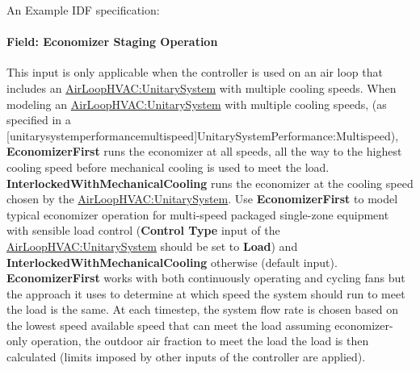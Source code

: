 An Example IDF specification:

\paragraph{Field: Economizer Staging Operation}\label{field-economizer-staging-operation}

This input is only applicable when the controller is used on an air loop that includes an \hyperref[airloophvacunitarysystem]{AirLoopHVAC:UnitarySystem} with multiple cooling speeds. When modeling an \hyperref[airloophvacunitarysystem]{AirLoopHVAC:UnitarySystem} with multiple cooling speeds, (as specified in a [unitarysystemperformancemultispeed]{UnitarySystemPerformance:Multispeed}), \textbf{EconomizerFirst} runs the economizer at all speeds, all the way to the highest cooling speed before mechanical cooling is used to meet the load. \textbf{InterlockedWithMechanicalCooling} runs the economizer at the cooling speed chosen by the \hyperref[airloophvacunitarysystem]{AirLoopHVAC:UnitarySystem}. Use \textbf{EconomizerFirst} to model typical economizer operation for multi-speed packaged single-zone equipment with sensible load control (\textbf{Control Type} input of the \hyperref[airloophvacunitarysystem]{AirLoopHVAC:UnitarySystem} should be set to \textbf{Load}) and \textbf{InterlockedWithMechanicalCooling} otherwise (default input). \textbf{EconomizerFirst} works with both continuously operating and cycling fans but the approach it uses to determine at which speed the system should run to meet the load is the same. At each timestep, the system flow rate is chosen based on the lowest speed available speed that can meet the load assuming economizer-only operation, the outdoor air fraction to meet the load the load is then calculated (limits imposed by other inputs of the controller are applied).

